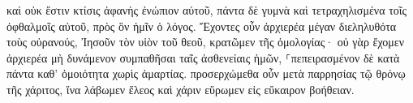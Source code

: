 \documentclass{openreader}
\begin{document}
καὶ οὐκ ἔστιν κτίσις ἀφανὴς ἐνώπιον αὐτοῦ, πάντα δὲ γυμνὰ καὶ τετραχηλισμένα τοῖς ὀφθαλμοῖς αὐτοῦ, πρὸς ὃν ἡμῖν ὁ λόγος. 
Ἔχοντες οὖν ἀρχιερέα μέγαν διεληλυθότα τοὺς οὐρανούς, Ἰησοῦν τὸν υἱὸν τοῦ θεοῦ, κρατῶμεν τῆς ὁμολογίας· 
οὐ γὰρ ἔχομεν ἀρχιερέα μὴ δυνάμενον συμπαθῆσαι ταῖς ἀσθενείαις ἡμῶν, ⸀πεπειρασμένον δὲ κατὰ πάντα καθ’ ὁμοιότητα χωρὶς ἁμαρτίας. 
προσερχώμεθα οὖν μετὰ παρρησίας τῷ θρόνῳ τῆς χάριτος, ἵνα λάβωμεν ἔλεος καὶ χάριν εὕρωμεν εἰς εὔκαιρον βοήθειαν. 
\end{document}
